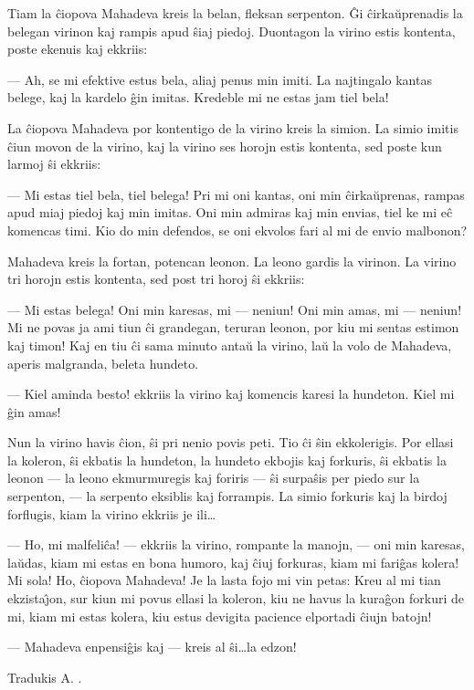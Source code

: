    Tiam la \^ciopova Mahadeva kreis la belan, fleksan serpenton. \^Gi
\^cir\-ka\u u\-pre\-na\-dis la belegan virinon kaj rampis apud
\^siaj piedoj. Duontagon la virino estis kontenta, poste ekenuis kaj
ekkriis:

 --- Ah, se mi efektive estus bela, aliaj penus min imiti. La
najtingalo kantas belege, kaj la kardelo \^gin imitas. Kredeble mi
ne estas jam tiel bela!

   La \^ciopova Mahadeva por kontentigo de la virino kreis la simion. La
simio imitis \^ciun movon de la virino, kaj la virino ses horojn
estis kontenta, sed poste kun larmoj \^si ekkriis:

 --- Mi estas tiel bela, tiel belega! Pri mi oni kantas, oni min
\^cirka\u uprenas, rampas apud miaj piedoj kaj min imitas. Oni min
admiras kaj min envias, tiel ke mi e\^c komencas timi. Kio do min
defendos, se oni ekvolos fari al mi de envio malbonon?

   Mahadeva kreis la fortan, potencan leonon. La leono gardis la
virinon. La virino tri horojn estis kontenta, sed post tri horoj
\^si ekkriis:

 --- Mi estas belega! Oni min karesas, mi --- neniun! Oni min amas, mi
 --- neniun! Mi ne povas ja ami tiun \^ci grandegan, teruran leonon,
por kiu mi sentas estimon kaj timon! Kaj en tiu \^ci sama minuto
anta\u u la virino, la\u u la volo de Mahadeva, aperis malgranda,
beleta hundeto.

 --- Kiel aminda besto! ekkriis la virino kaj komencis karesi la
hundeton. Kiel mi \^gin amas!

   Nun la virino havis \^cion, \^si pri nenio povis peti. Tio \^ci \^sin
ekkolerigis. Por ellasi la koleron, \^si ekbatis la hundeton, la
hundeto ekbojis kaj forkuris, \^si ekbatis la leonon --- la leono
ekmurmuregis kaj foriris --- \^si surpa\^sis per piedo sur la
serpenton, --- la serpento eksiblis kaj forrampis. La simio forkuris
kaj la birdoj forflugis, kiam la virino ekkriis je ili\dots

 --- Ho, mi malfeli\^ca! --- ekkriis la virino, rompante la manojn,
 --- oni min karesas, la\u udas, kiam mi estas en bona humoro, kaj
\^ciuj forkuras, kiam mi fari\^gas kolera! Mi sola! Ho, \^ciopova
Mahadeva! Je la lasta fojo mi vin petas: Kreu al mi tian
ekzista\^{\j}on, sur kiun mi povus ellasi la koleron, kiu ne havus
la kura\^gon forkuri de mi, kiam mi estas kolera, kiu estus devigita
pacience elportadi \^ciujn batojn!

 --- Mahadeva enpensi\^gis kaj --- kreis al \^si\dots la edzon!

\begin{flushright}
\footnotesize Tradukis A. .
\end{flushright}

\smallrule{}
